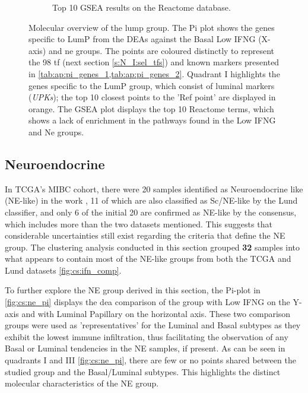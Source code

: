 \begin{figure}[H]
\begin{subfigure}[!t]{0.83\textwidth}
        \caption{Top 10 GSEA results on the Reactome database.}
        \label{fig:cs:lumP_gsea}
    \end{subfigure} 
    \centering
    \caption[LumP like: overview of the molecular properties]{Molecular overview of the \acrfull{lump} group. The Pi plot shows the genes specific to LumP from the DEAs against the Basal Low IFNG (X-axis) and \acrlong{ne} groups. The points are coloured distinctly to represent the 98 \acrlong{tf} (next section \cref{s:N_I:sel_tfs}) and known markers presented in \cref{tab:ap:pi_genes_1,tab:ap:pi_genes_2}. Quadrant I highlights the genes specific to the LumP group, which consist of luminal markers (\textit{UPKs}); the top 10 closest points to the 'Ref point' are displayed in orange. The GSEA plot displays the top 10 Reactome terms, which shows a lack of enrichment in the pathways found in the Low IFNG and Ne groups.}
    \label{fig:cs:lump}
\end{figure}


\subsection{Neuroendocrine} \label{s:cs:ne_interp}


In TCGA's MIBC cohort, there were 20 samples identified as Neuroendocrine like (NE-like) in the work \citet{Robertson2017-mg}, 11 of which are also classified as Sc/NE-like by the Lund classifier, and only 6 of the initial 20 are confirmed as NE-like by the consensus, which includes more than the two datasets mentioned. This suggests that considerable uncertainties still exist regarding the criteria that define the NE group. The clustering analysis conducted in this section grouped \textbf{32} samples into what appears to contain most of the NE-like groups from both the TCGA and Lund datasets \cref{fig:cs:ifn_comp}.

To further explore the NE group derived in this section, the Pi-plot in \cref{fig:cs:ne_pi} displays the \acrshort{dea} comparison of the group with Low IFNG on the Y-axis and with Luminal Papillary on the horizontal axis. These two comparison groups were used as 'representatives' for the Luminal and Basal subtypes as they exhibit the lowest immune infiltration, thus facilitating the observation of any Basal or Luminal tendencies in the NE samples, if present. As can be seen in quadrants I and III \cref{fig:cs:ne_pi}, there are few or no points shared between the studied group and the Basal/Luminal subtypes. This highlights the distinct molecular characteristics of the NE group.


